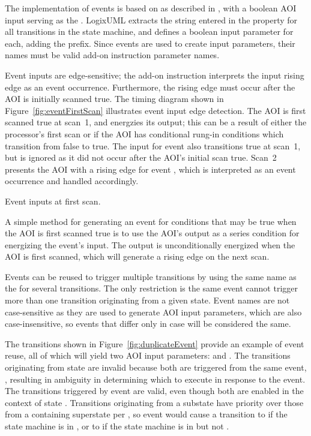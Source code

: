 The implementation of events is based on 
as described in \textcite[\S13.3.3.3]{OMGUML}, with a boolean AOI input
serving as the . LogixUML extracts
the string entered in the  property for
all transitions
in the state machine, and defines a boolean input parameter for each,
adding the  prefix. Since events are used to create
input parameters, their names must be valid add-on instruction parameter
names.

Event inputs are edge-sensitive; the add-on instruction interprets the
input rising edge as an event occurrence. Furthermore,
the rising edge must occur after the AOI is initially scanned true.
The timing diagram shown in Figure~\ref{fig:eventFirstScan} illustrates
event input edge detection. The AOI is first scanned true at scan~1, and
energzies its  output; this can be a result of either
the processor's first scan or if the AOI has conditional rung-in
conditions which transition from false to true.
The input for event  also transitions true at scan~1, but
is ignored as it did not occur after the AOI's initial scan true.
Scan~2 presents the AOI with a rising edge for event ,
which is interpreted as an event occurrence and handled accordingly.

               {Event inputs at first scan.}

A simple method for generating an event for conditions that may be
true when the AOI is first scanned true is to use the AOI's
 output as a series condition for energizing the
event's input. The  output is unconditionally energized
when the AOI is first scanned, which will generate a rising edge on the
next scan.

Events can be reused to trigger multiple transitions by using the
same name as the  for several transitions.
The only restriction is the same event cannot trigger more than
one transition originating from a given state.
Event names are not case-sensitive as they are used to generate AOI input
parameters, which are also case-insensitive, so events that differ only in
case will be considered the same.

The transitions shown in Figure~\ref{fig:duplicateEvent} provide an example
of event reuse, all of which will yield two AOI input parameters:
 and .
The transitions originating from state  are invalid because
both are triggered from the same event, ,
resulting in ambiguity in determining which to execute in response to the event.
The transitions triggered by event  are valid, even though both
are enabled in the context of state .
Transitions originating from a substate have priority over those
from a containing superstate per \textcite[\S14.2.3.9.4]{OMGUML}, so
event  would cause a transition to  if the
state machine is in , or to  if the state
machine is in  but not .

